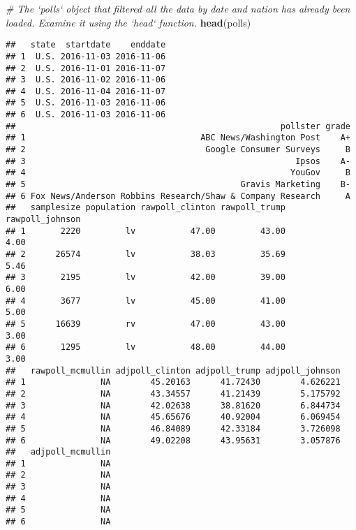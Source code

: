\documentclass[]{article}
\newenvironment{Shaded}{\begin{snugshade}}{\end{snugshade}}
\newcommand{\KeywordTok}[1]{\textcolor[rgb]{0.13,0.29,0.53}{\textbf{#1}}}
\newcommand{\CommentTok}[1]{\textcolor[rgb]{0.56,0.35,0.01}{\textit{#1}}}
\newcommand{\NormalTok}[1]{#1}
\begin{document}
\begin{Shaded}
\begin{Highlighting}[]
\CommentTok{# The `polls` object that filtered all the data by date and nation has already been loaded. Examine it using the `head` function.}
\KeywordTok{head}\NormalTok{(polls)}
\end{Highlighting}
\end{Shaded}

\begin{verbatim}
##   state  startdate    enddate
## 1  U.S. 2016-11-03 2016-11-06
## 2  U.S. 2016-11-01 2016-11-07
## 3  U.S. 2016-11-02 2016-11-06
## 4  U.S. 2016-11-04 2016-11-07
## 5  U.S. 2016-11-03 2016-11-06
## 6  U.S. 2016-11-03 2016-11-06
##                                                     pollster grade
## 1                                   ABC News/Washington Post    A+
## 2                                    Google Consumer Surveys     B
## 3                                                      Ipsos    A-
## 4                                                     YouGov     B
## 5                                           Gravis Marketing    B-
## 6 Fox News/Anderson Robbins Research/Shaw & Company Research     A
##   samplesize population rawpoll_clinton rawpoll_trump rawpoll_johnson
## 1       2220         lv           47.00         43.00            4.00
## 2      26574         lv           38.03         35.69            5.46
## 3       2195         lv           42.00         39.00            6.00
## 4       3677         lv           45.00         41.00            5.00
## 5      16639         rv           47.00         43.00            3.00
## 6       1295         lv           48.00         44.00            3.00
##   rawpoll_mcmullin adjpoll_clinton adjpoll_trump adjpoll_johnson
## 1               NA        45.20163      41.72430        4.626221
## 2               NA        43.34557      41.21439        5.175792
## 3               NA        42.02638      38.81620        6.844734
## 4               NA        45.65676      40.92004        6.069454
## 5               NA        46.84089      42.33184        3.726098
## 6               NA        49.02208      43.95631        3.057876
##   adjpoll_mcmullin
## 1               NA
## 2               NA
## 3               NA
## 4               NA
## 5               NA
## 6               NA
\end{verbatim}
\end{document}
